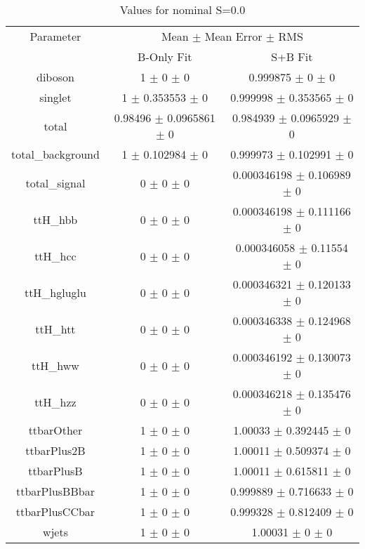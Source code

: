 \begin{table}
\centering
\caption{Values for nominal S=0.0}
\begin{tabular}{ccc}
\toprule
Parameter & \multicolumn{2}{c}{Mean $\pm$ Mean Error $\pm$ RMS}\\
 & B-Only Fit & S+B Fit\\
\midrule
diboson & \num{1} $\pm$ \num{0} $\pm$ \num{0} & \num{0.999875} $\pm$ \num{0} $\pm$ \num{0}\\
singlet & \num{1} $\pm$ \num{0.353553} $\pm$ \num{0} & \num{0.999998} $\pm$ \num{0.353565} $\pm$ \num{0}\\
total & \num{0.98496} $\pm$ \num{0.0965861} $\pm$ \num{0} & \num{0.984939} $\pm$ \num{0.0965929} $\pm$ \num{0}\\
total\_background & \num{1} $\pm$ \num{0.102984} $\pm$ \num{0} & \num{0.999973} $\pm$ \num{0.102991} $\pm$ \num{0}\\
total\_signal & \num{0} $\pm$ \num{0} $\pm$ \num{0} & \num{0.000346198} $\pm$ \num{0.106989} $\pm$ \num{0}\\
ttH\_hbb & \num{0} $\pm$ \num{0} $\pm$ \num{0} & \num{0.000346198} $\pm$ \num{0.111166} $\pm$ \num{0}\\
ttH\_hcc & \num{0} $\pm$ \num{0} $\pm$ \num{0} & \num{0.000346058} $\pm$ \num{0.11554} $\pm$ \num{0}\\
ttH\_hgluglu & \num{0} $\pm$ \num{0} $\pm$ \num{0} & \num{0.000346321} $\pm$ \num{0.120133} $\pm$ \num{0}\\
ttH\_htt & \num{0} $\pm$ \num{0} $\pm$ \num{0} & \num{0.000346338} $\pm$ \num{0.124968} $\pm$ \num{0}\\
ttH\_hww & \num{0} $\pm$ \num{0} $\pm$ \num{0} & \num{0.000346192} $\pm$ \num{0.130073} $\pm$ \num{0}\\
ttH\_hzz & \num{0} $\pm$ \num{0} $\pm$ \num{0} & \num{0.000346218} $\pm$ \num{0.135476} $\pm$ \num{0}\\
ttbarOther & \num{1} $\pm$ \num{0} $\pm$ \num{0} & \num{1.00033} $\pm$ \num{0.392445} $\pm$ \num{0}\\
ttbarPlus2B & \num{1} $\pm$ \num{0} $\pm$ \num{0} & \num{1.00011} $\pm$ \num{0.509374} $\pm$ \num{0}\\
ttbarPlusB & \num{1} $\pm$ \num{0} $\pm$ \num{0} & \num{1.00011} $\pm$ \num{0.615811} $\pm$ \num{0}\\
ttbarPlusBBbar & \num{1} $\pm$ \num{0} $\pm$ \num{0} & \num{0.999889} $\pm$ \num{0.716633} $\pm$ \num{0}\\
ttbarPlusCCbar & \num{1} $\pm$ \num{0} $\pm$ \num{0} & \num{0.999328} $\pm$ \num{0.812409} $\pm$ \num{0}\\
wjets & \num{1} $\pm$ \num{0} $\pm$ \num{0} & \num{1.00031} $\pm$ \num{0} $\pm$ \num{0}\\
\bottomrule
\end{tabular}
\end{table}